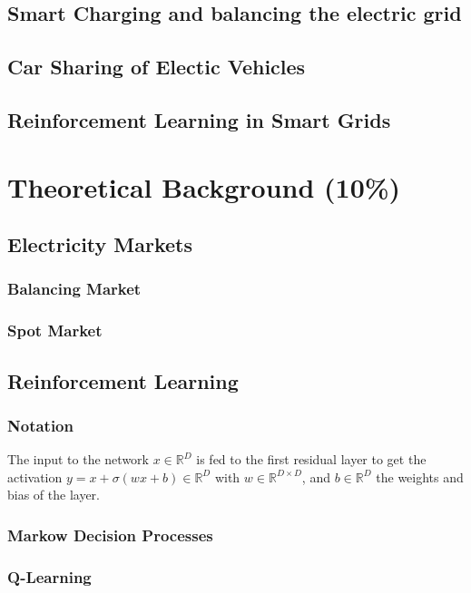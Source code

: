 \documentclass[a4paper]{article}
\begin{document}
\subsection{Smart Charging and balancing the electric grid}
\label{sec:orgccbb2ce}
\subsection{Car Sharing of Electic Vehicles}
\label{sec:orgee09933}
\subsection{Reinforcement Learning in Smart Grids}
\label{sec:org1865433}

\section{Theoretical Background (10\%)}
\label{sec:orgcf03678}
\subsection{Electricity Markets}
\label{sec:orgbf7aeff}
\subsubsection{Balancing Market}
\label{sec:org086972d}
\subsubsection{Spot Market}
\label{sec:orgb7b6a2c}
\subsection{Reinforcement Learning}
\label{sec:org4d532c6}
\subsubsection{Notation}
\label{sec:org7039fc2}
The input to the network \(x \in \mathbb{R}^D\) is fed to the first residual layer to get the activation \(y = x + \sigma(w x + b) \in \mathbb{R}^D\) with \(w \in \mathbb{R}^{D \times D}\), and \(b \in \mathbb{R}^D\) the weights and bias of the layer.
\subsubsection{Markow Decision Processes}
\label{sec:org0e4f489}
\subsubsection{Q-Learning}
\label{sec:org84351e5}
\end{document}
